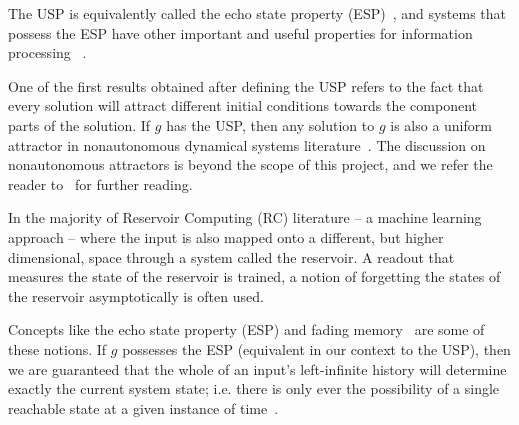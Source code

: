 The USP is equivalently called  the echo state property (ESP)~\cite{Manju_ESP}, and systems that possess the ESP have other important and useful properties for information processing~\cite{grigoryeva2018echo, grigoryeva2019differentiable, manjunath2020stability} .  

One of the first results obtained after defining the USP refers to the fact that every solution will attract different initial conditions towards the component parts of the solution.
If $g$ has the USP, then any solution to $g$ is also a uniform attractor in nonautonomous dynamical systems literature~\cite{Manju_Nonlinearity}. The discussion on nonautonomous attractors is beyond the scope of this project, and we refer the reader to~\cite{Manju_ESP, esann2012ids} for further reading. 


In the majority of Reservoir Computing (RC) literature -- a machine learning approach -- where the input is also mapped onto a different, but higher dimensional, space through a system called the reservoir. A readout that measures the state of the reservoir is trained, a notion of forgetting the states of the reservoir asymptotically is often used.   

Concepts like the echo state property (ESP) and fading memory~\cite{boyd1985fading} are some of these notions.  
If $g$ possesses the ESP (equivalent in our context to the USP), then we are guaranteed that the whole of an input's left-infinite history will determine exactly the current system state; i.e. there is only ever the possibility of a single reachable state at a given instance of time~\cite{jaeger2001echo,Manju_2020}.


